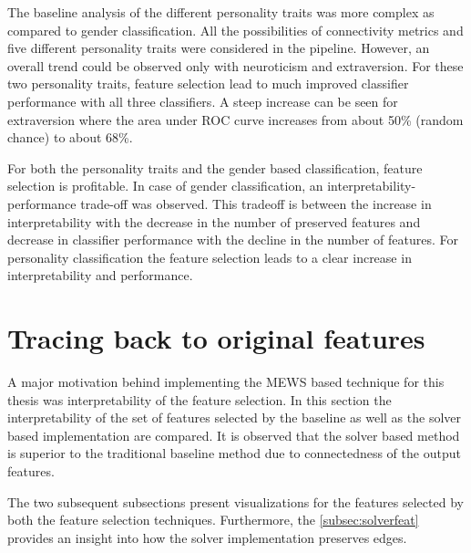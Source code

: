 \documentclass[msthesis.tex]{subfiles}
\begin{document}
The baseline analysis of the different personality traits was more complex as compared to gender classification. All the possibilities of connectivity metrics and five different personality traits were considered in the pipeline. However, an overall trend could be observed only with neuroticism and extraversion. For these two personality traits, feature selection lead to much improved classifier performance with all three classifiers. A steep increase can be seen for extraversion where the area under ROC curve increases from about 50\% (random chance) to about 68\%.

For both the personality traits and the gender based classification, feature selection is profitable. In case of gender classification, an interpretability-performance trade-off was observed. This tradeoff is between the increase in interpretability with the decrease in the number of preserved features and decrease in classifier performance with the decline in the number of features. For personality classification the feature selection leads to a clear increase in interpretability and performance.

\section{Tracing back to original features}
A major motivation behind implementing the MEWS based technique for this thesis was interpretability of the feature selection. In this section the interpretability of the set of features selected by the baseline as well as the solver based implementation are compared. It is observed that the solver based method is superior to the traditional baseline method due to connectedness of the output features. 

The two subsequent subsections present visualizations for the features selected by both the feature selection techniques. Furthermore, the \autoref{subsec:solverfeat} provides an insight into how the solver implementation preserves edges. 
\end{document}

